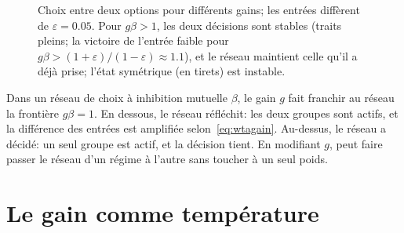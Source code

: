 \begin{figure}[t]
\centering
{}
\caption{Choix entre deux options pour différents gains; les entrées diffèrent de $\varepsilon=0.05$. Pour $g\beta>1$, les deux décisions sont stables (traits pleins; la victoire de l'entrée faible pour $g\beta>(1+\varepsilon)/(1-\varepsilon)\approx1.1$), et le réseau maintient celle qu'il a déjà prise; l'état symétrique (en tirets) est instable.}
\label{fig:pitchfork}
\end{figure}

\begin{keyblock}
\begin{proposition}
\label{prop:gainwta}
Dans un réseau de choix à inhibition mutuelle $\beta$, le gain $g$ fait franchir au réseau la frontière $g\beta=1$. En dessous, le réseau \og réfléchit\fg{}: les deux groupes sont actifs, et la différence des entrées est amplifiée selon~\eqref{eq:wtagain}. Au-dessus, le réseau \og a décidé\fg{}: un seul groupe est actif, et la décision tient. En modifiant $g$,  peut faire passer le réseau d'un régime à l'autre sans toucher à un seul poids.
\end{proposition}
\end{keyblock}

\section{Le gain comme température}

